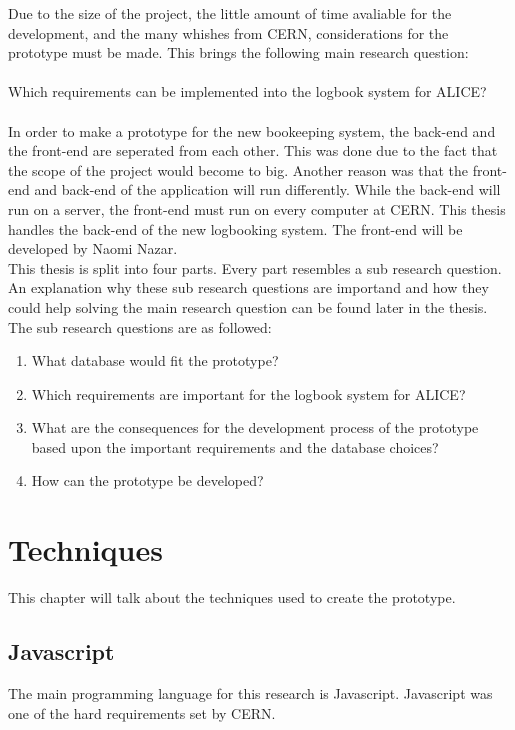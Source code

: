 \documentclass[paper=a4, fontsize=11pt,twoside]{scrartcl}	%
\begin{document}
Due to the size of the project, the little amount of time avaliable for the development, and the many whishes from CERN, 
considerations for the prototype must be made. This brings the following main research question: \\ \\
Which requirements can be implemented into the logbook system for ALICE?
\\ \\
In order to make a prototype for the new bookeeping system, the back-end and the front-end are seperated from each other. This was done due to the fact that the scope of the project would become to big. Another reason was that the front-end and back-end of the application will run differently. While the back-end will run on a server, the front-end must run on every computer at CERN. This thesis handles the back-end of the new logbooking system. The front-end will be developed by Naomi Nazar. 
\\ 
This thesis is split into four parts. Every part resembles a sub research question. An explanation why these sub research questions are importand and how they could help solving the main research question can be found later in the thesis. The sub research questions are as followed: \\
\begin{enumerate}
\item What database would fit the prototype?
\item Which requirements are important for the logbook system for ALICE?
\item What are the consequences for the development process of the prototype based upon the important requirements and the database choices?
\item How can the prototype be developed?
\end{enumerate}
 

 

\newpage
\section{Techniques}
This chapter will talk about the techniques used to create the prototype.

\subsection{Javascript}
The main programming language for this research is Javascript. Javascript was one of the hard requirements set by CERN.
\end{document}
